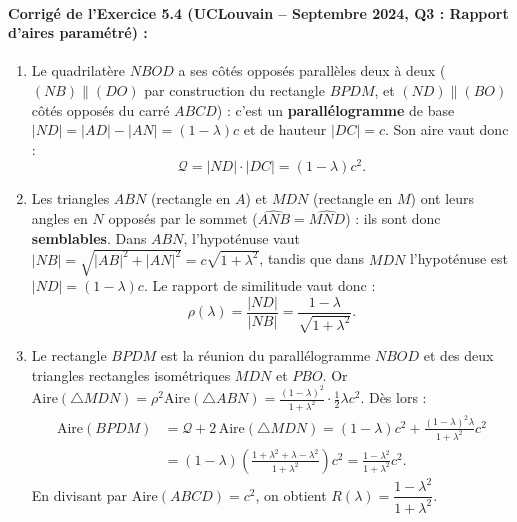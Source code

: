 \paragraph{Corrigé de l'Exercice 5.4 (UCLouvain -- Septembre 2024, Q3 : Rapport d'aires paramétré) :}
\begin{enumerate}[label=(\alph*)]
    \item Le quadrilatère $NBOD$ a ses côtés opposés parallèles deux à deux ($(NB) \parallel (DO)$ par construction du rectangle $BPDM$, et $(ND) \parallel (BO)$ côtés opposés du carré $ABCD$) : c'est un \textbf{parallélogramme} de base $|ND| = |AD| - |AN| = (1-\lambda)c$ et de hauteur $|DC| = c$. Son aire vaut donc :
    \[
        \mathcal{Q} = |ND| \cdot |DC| = \boxed{(1-\lambda)c^2}.
    \]
    \item Les triangles $ABN$ (rectangle en $A$) et $MDN$ (rectangle en $M$) ont leurs angles en $N$ opposés par le sommet ($\widehat{ANB} = \widehat{MND}$) : ils sont donc \textbf{semblables}. Dans $ABN$, l'hypoténuse vaut $|NB| = \sqrt{|AB|^2 + |AN|^2} = c\sqrt{1+\lambda^2}$, tandis que dans $MDN$ l'hypoténuse est $|ND| = (1-\lambda)c$. Le rapport de similitude vaut donc :
    \[
        \rho(\lambda) = \frac{|ND|}{|NB|} = \boxed{\frac{1-\lambda}{\sqrt{1+\lambda^2}}}.
    \]
    \item Le rectangle $BPDM$ est la réunion du parallélogramme $NBOD$ et des deux triangles rectangles isométriques $MDN$ et $PBO$. Or $\text{Aire}(\triangle MDN) = \rho^2 \text{Aire}(\triangle ABN) = \frac{(1-\lambda)^2}{1+\lambda^2}\cdot\frac{1}{2}\lambda c^2$. Dès lors :
    \begin{align*}
        \text{Aire}(BPDM) &= \mathcal{Q} + 2\,\text{Aire}(\triangle MDN) = (1-\lambda)c^2 + \frac{(1-\lambda)^2\lambda}{1+\lambda^2}c^2 \\
        &= (1-\lambda)\left(\frac{1+\lambda^2+\lambda-\lambda^2}{1+\lambda^2}\right)c^2 = \frac{1-\lambda^2}{1+\lambda^2}c^2.
    \end{align*}
    En divisant par $\text{Aire}(ABCD) = c^2$, on obtient $R(\lambda) = \boxed{\dfrac{1-\lambda^2}{1+\lambda^2}}$.
\end{enumerate}


